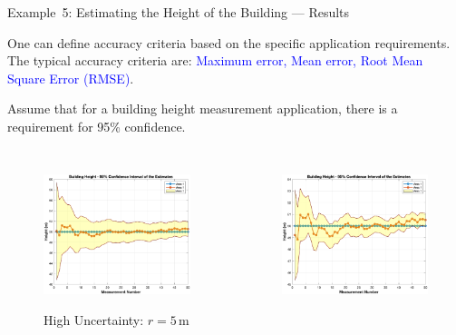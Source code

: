 \begin{frame}{Example~5: Estimating the Height of the Building --- Results}

One can define accuracy criteria based on the specific application requirements. The
typical accuracy criteria are: \textcolor{blue}{Maximum error, Mean error, Root Mean Square Error (RMSE)}.


Assume that for a building height measurement application, there is a requirement for 95\% confidence.
\begin{columns}
        \begin{figure}
	   \centering
	\includegraphics[width=1\textwidth]{Figures/Chapter1/ex5_FirstKalmanFilter_highUncertainty.eps}  \label{fig:ex5_FirstKalmanFilter_highUncertainty}
  \vspace{-20pt}
    \caption{High Uncertainty: $r=5$\,m}
    \end{figure}
        \begin{figure}
	   \centering
	\includegraphics[width=1\textwidth]{Figures/Chapter1/ex5_FirstKalmanFilter_highUncertainty_r2.eps}  \label{fig:ex5_FirstKalmanFilter_highUncertainty}

\end{figure}
\end{columns}
\end{frame}
